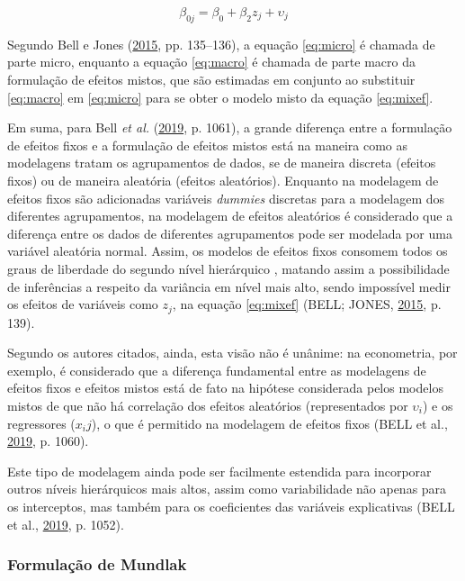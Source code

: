 \documentclass[
  a4paper, 11pt]{article}
\begin{document}
\begin{equation} \label{eq:macro}
\beta_{0j} = \beta_0 + \beta_2 z_{j} + \upsilon_{j} 
\end{equation}

Segundo Bell e Jones (\protect\hyperlink{ref-bell2015}{2015}, pp.
135--136), a equação \ref{eq:micro} é chamada de parte micro, enquanto a
equação \ref{eq:macro} é chamada de parte macro da formulação de efeitos
mistos, que são estimadas em conjunto ao substituir \ref{eq:macro} em
\ref{eq:micro} para se obter o modelo misto da equação \ref{eq:mixef}.

Em suma, para Bell \emph{et al.}
(\protect\hyperlink{ref-bell2019}{2019}, p. 1061), a grande diferença
entre a formulação de efeitos fixos e a formulação de efeitos mistos
está na maneira como as modelagens tratam os agrupamentos de dados, se
de maneira discreta (efeitos fixos) ou de maneira aleatória (efeitos
aleatórios). Enquanto na modelagem de efeitos fixos são adicionadas
variáveis \emph{dummies} discretas para a modelagem dos diferentes
agrupamentos, na modelagem de efeitos aleatórios é considerado que a
diferença entre os dados de diferentes agrupamentos pode ser modelada
por uma variável aleatória normal. Assim, os modelos de efeitos fixos
consomem todos os graus de liberdade do segundo nível hierárquico ,
matando assim a possibilidade de inferências a respeito da variância em
nível mais alto, sendo impossível medir os efeitos de variáveis como
\(z_j\), na equação \ref{eq:mixef} (BELL; JONES,
\protect\hyperlink{ref-bell2015}{2015}, p. 139).

Segundo os autores citados, ainda, esta visão não é unânime: na
econometria, por exemplo, é considerado que a diferença fundamental
entre as modelagens de efeitos fixos e efeitos mistos está de fato na
hipótese considerada pelos modelos mistos de que não há correlação dos
efeitos aleatórios (representados por \(\upsilon_i\)) e os regressores
(\(x_ij\)), o que é permitido na modelagem de efeitos fixos (BELL et
al., \protect\hyperlink{ref-bell2019}{2019}, p. 1060).

Este tipo de modelagem ainda pode ser facilmente estendida para
incorporar outros níveis hierárquicos mais altos, assim como
variabilidade não apenas para os interceptos, mas também para os
coeficientes das variáveis explicativas (BELL et al.,
\protect\hyperlink{ref-bell2019}{2019}, p. 1052).

\hypertarget{formulauxe7uxe3o-de-mundlak}{%
\subsubsection{Formulação de
Mundlak}\label{formulauxe7uxe3o-de-mundlak}}
\end{document}

